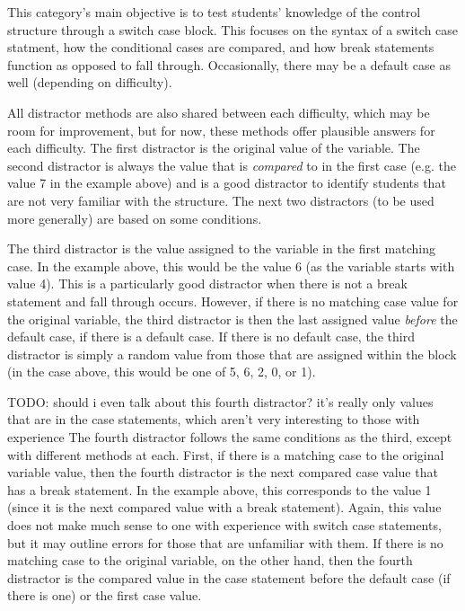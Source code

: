 \documentclass{article}
\begin{document}
This category's main objective is to test students' knowledge of the control structure through a switch case block. This focuses on the syntax of a switch case statment, how
the conditional cases are compared, and how break statements function as opposed to fall through. Occasionally, there may be a default case as well (depending on difficulty). 

All distractor methods are also shared between each difficulty, which may be room for improvement, but for now, these methods offer plausible answers for each difficulty. The first distractor is
the original value of the variable. The second distractor is always the value that is \textit{compared} to in the first case (e.g. the value 7 in the example above) and is a good distractor to identify students that are not very familiar with the structure. The next two distractors (to be used more generally) are based on some conditions. 

The third distractor is the value assigned to the variable in the first matching case. In the example above, this would be the value 6 (as the variable starts with value 4). This is a particularly good distractor when there is not a break statement
and fall through occurs. However, if there is no matching case value for the original variable, the third distractor is then the last assigned value \textit{before} the default case, if there is a
default case. If there is no default case, the third distractor is simply a random value from those that are assigned within the block (in the case above, this would be one of 5, 6, 2, 0, or 1). 

TODO: should i even talk about this fourth distractor? it's really only values that are in the case statements, which aren't very interesting to those with experience
The fourth distractor follows the same conditions as the third, except with different methods at each. First, if there is a matching case to the original variable value, then the fourth distractor
is the next compared case value that has a break statement. In the example above, this corresponds to the value 1 (since it is the next compared value with a break statement). Again, this
value does not make much sense to one with experience with switch case statements, but it may outline errors for those that are unfamiliar with them. If there is no matching case to the 
original variable, on the other hand, then the fourth distractor is the compared value in the case statement before the default case (if there is one) or the first case value. 
\end{document}
